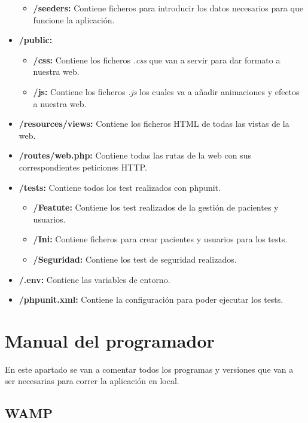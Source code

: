 \begin{itemize}
\begin{itemize}
        \item \textbf{/seeders:} Contiene ficheros para introducir los datos necesarios para que funcione la aplicación.
    \end{itemize}
    \item \textbf{/public:} 
    \begin{itemize}
        \item \textbf{/css:} Contiene los ficheros \textit{.css} que van a servir para dar formato a nuestra web.
        \item \textbf{/js:} Contiene los ficheros \textit{.js} los cuales va a añadir animaciones y efectos a nuestra web.
    \end{itemize}
    \item \textbf{/resources/views:} Contiene los ficheros HTML de todas las vistas de la web.
    \item \textbf{/routes/web.php:} Contiene todas las rutas de la web con sus correspondientes peticiones HTTP.
    \item \textbf{/tests:} Contiene todos los test realizados con phpunit.
    \begin{itemize}
        \item \textbf{/Featute:} Contiene los test realizados de la gestión de pacientes y usuarios.
        \item \textbf{/Ini:} Contiene ficheros para crear pacientes y usuarios para los tests.
        \item \textbf{/Seguridad:} Contiene los test de seguridad realizados.
    \end{itemize}
    \item \textbf{/.env:} Contiene las variables de entorno.
    \item \textbf{/phpunit.xml:} Contiene la configuración para poder ejecutar los tests.
\end{itemize}

\section{Manual del programador} \label{manual}

En este apartado se van a comentar todos los programas y versiones que van a ser necesarias para correr la aplicación en local.

\subsection{WAMP}

